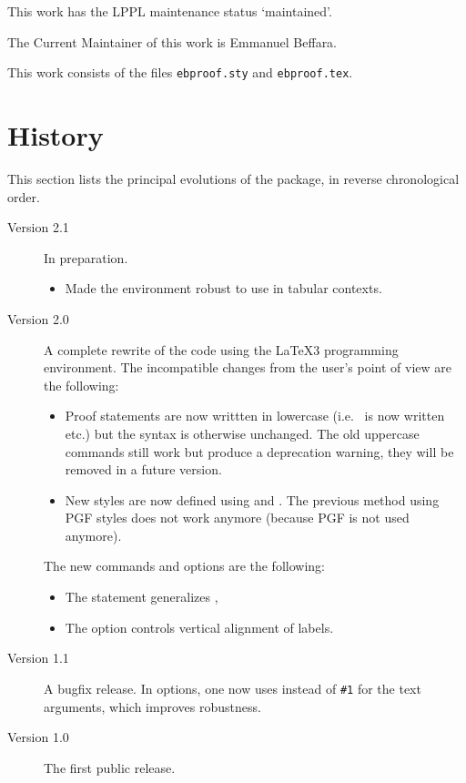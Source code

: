 \documentclass{l3doc}
\begin{document}
This work has the LPPL maintenance status `maintained'.

The Current Maintainer of this work is Emmanuel Beffara.

This work consists of the files \texttt{ebproof.sty} and \texttt{ebproof.tex}.

\section{History}

This section lists the principal evolutions of the package, in reverse
chronological order.
\begin{description}
\item[Version 2.1]
  In preparation.
  \begin{itemize}
  \item Made the  environment robust to use in tabular
    contexts.
  \end{itemize}
\item[Version 2.0]
  A complete rewrite of the code using the \LaTeX3 programming environment. 
  The incompatible changes from the user's point of view are the following:
  \begin{itemize}
  \item Proof statements are now writtten in lowercase ({i.e.}  is
    now written  etc.) but the syntax is otherwise unchanged.
    The old uppercase commands still work but produce a deprecation warning,
    they will be removed in a future version.
  \item New styles are now defined using  and
    . The previous method using PGF styles does not
    work anymore (because PGF is not used anymore).
  \end{itemize}
  The new commands and options are the following:
  \begin{itemize}
  \item The statement  generalizes ,
  \item The option  controls vertical alignment of labels.
  \end{itemize}
\item[Version 1.1]
  A bugfix release.
  In  options, one now uses  instead of \verb|#1|
  for the text arguments, which improves robustness.
\item[Version 1.0]
  The first public release.
\end{description}
\end{document}
